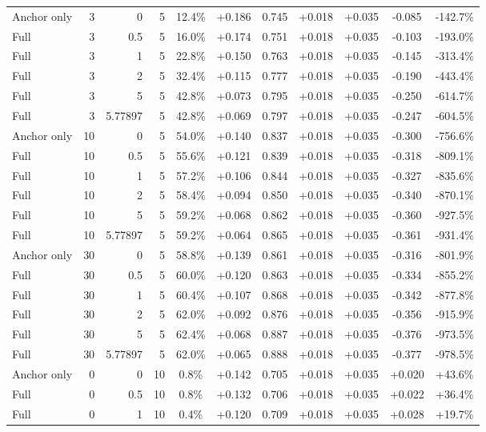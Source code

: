 \begin{table}[htbp]
\begin{tabular}{lrrrccccccc}
Anchor only & 3 & 0 & 5 & 12.4\% & +0.186 & 0.745 & +0.018 & +0.035 & -0.085 & -142.7\% \\
Full & 3 & 0.5 & 5 & 16.0\% & +0.174 & 0.751 & +0.018 & +0.035 & -0.103 & -193.0\% \\
Full & 3 & 1 & 5 & 22.8\% & +0.150 & 0.763 & +0.018 & +0.035 & -0.145 & -313.4\% \\
Full & 3 & 2 & 5 & 32.4\% & +0.115 & 0.777 & +0.018 & +0.035 & -0.190 & -443.4\% \\
Full & 3 & 5 & 5 & 42.8\% & +0.073 & 0.795 & +0.018 & +0.035 & -0.250 & -614.7\% \\
Full & 3 & 5.77897 & 5 & 42.8\% & +0.069 & 0.797 & +0.018 & +0.035 & -0.247 & -604.5\% \\
Anchor only & 10 & 0 & 5 & 54.0\% & +0.140 & 0.837 & +0.018 & +0.035 & -0.300 & -756.6\% \\
Full & 10 & 0.5 & 5 & 55.6\% & +0.121 & 0.839 & +0.018 & +0.035 & -0.318 & -809.1\% \\
Full & 10 & 1 & 5 & 57.2\% & +0.106 & 0.844 & +0.018 & +0.035 & -0.327 & -835.6\% \\
Full & 10 & 2 & 5 & 58.4\% & +0.094 & 0.850 & +0.018 & +0.035 & -0.340 & -870.1\% \\
Full & 10 & 5 & 5 & 59.2\% & +0.068 & 0.862 & +0.018 & +0.035 & -0.360 & -927.5\% \\
Full & 10 & 5.77897 & 5 & 59.2\% & +0.064 & 0.865 & +0.018 & +0.035 & -0.361 & -931.4\% \\
Anchor only & 30 & 0 & 5 & 58.8\% & +0.139 & 0.861 & +0.018 & +0.035 & -0.316 & -801.9\% \\
Full & 30 & 0.5 & 5 & 60.0\% & +0.120 & 0.863 & +0.018 & +0.035 & -0.334 & -855.2\% \\
Full & 30 & 1 & 5 & 60.4\% & +0.107 & 0.868 & +0.018 & +0.035 & -0.342 & -877.8\% \\
Full & 30 & 2 & 5 & 62.0\% & +0.092 & 0.876 & +0.018 & +0.035 & -0.356 & -915.9\% \\
Full & 30 & 5 & 5 & 62.4\% & +0.068 & 0.887 & +0.018 & +0.035 & -0.376 & -973.5\% \\
Full & 30 & 5.77897 & 5 & 62.0\% & +0.065 & 0.888 & +0.018 & +0.035 & -0.377 & -978.5\% \\
Anchor only & 0 & 0 & 10 & 0.8\% & +0.142 & 0.705 & +0.018 & +0.035 & +0.020 & +43.6\% \\
Full & 0 & 0.5 & 10 & 0.8\% & +0.132 & 0.706 & +0.018 & +0.035 & +0.022 & +36.4\% \\
Full & 0 & 1 & 10 & 0.4\% & +0.120 & 0.709 & +0.018 & +0.035 & +0.028 & +19.7\% \\

\end{tabular}
\end{table}
